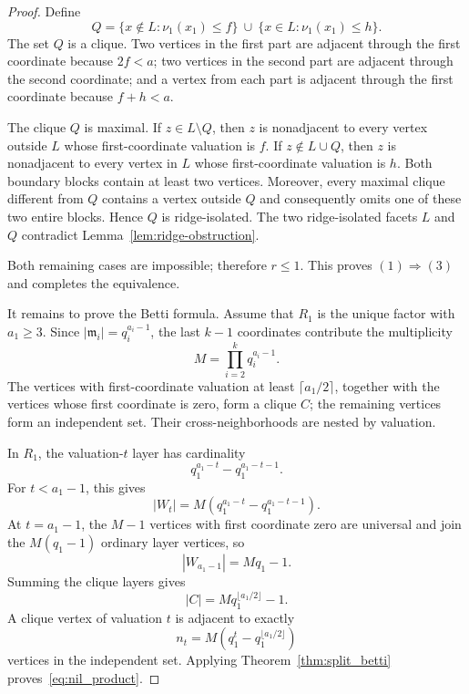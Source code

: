 \documentclass[10pt,a4paper]{amsart}
\begin{document}
\begin{proof}
Define
\[
Q=
\{x\notin L:\nu_1(x_1)\le f\}
\ \cup\
\{x\in L:\nu_1(x_1)\le h\}.
\]
The set $Q$ is a clique.  Two vertices in the first part are adjacent through the first coordinate because $2f<a$; two vertices in the second part are adjacent through the second coordinate; and a vertex from each part is adjacent through the first coordinate because $f+h<a$.

The clique $Q$ is maximal.  If $z\in L\setminus Q$, then $z$ is nonadjacent to every vertex outside $L$ whose first-coordinate valuation is $f$.  If $z\notin L\cup Q$, then $z$ is nonadjacent to every vertex in $L$ whose first-coordinate valuation is $h$.  Both boundary blocks contain at least two vertices.  Moreover, every maximal clique different from $Q$ contains a vertex outside $Q$ and consequently omits one of these two entire blocks.  Hence $Q$ is ridge-isolated.  The two ridge-isolated facets $L$ and $Q$ contradict Lemma~\ref{lem:ridge-obstruction}.

Both remaining cases are impossible; therefore $r\le1$.  This proves $(1)\Rightarrow(3)$ and completes the equivalence.

It remains to prove the Betti formula.  Assume that $R_1$ is the unique factor with $a_1\ge3$.  Since $|\mathfrak m_i|=q_i^{a_i-1}$, the last $k-1$ coordinates contribute the multiplicity
\[
M=\prod_{i=2}^{k}q_i^{a_i-1}.
\]
The vertices with first-coordinate valuation at least $\lceil a_1/2\rceil$, together with the vertices whose first coordinate is zero, form a clique $C$; the remaining vertices form an independent set.  Their cross-neighborhoods are nested by valuation.

In $R_1$, the valuation-$t$ layer has cardinality
\[
q_1^{a_1-t}-q_1^{a_1-t-1}.
\]
For $t<a_1-1$, this gives
\[
|W_t|=M(q_1^{a_1-t}-q_1^{a_1-t-1}).
\]
At $t=a_1-1$, the $M-1$ vertices with first coordinate zero are universal and join the $M(q_1-1)$ ordinary layer vertices, so
\[
|W_{a_1-1}|=Mq_1-1.
\]
Summing the clique layers gives
\[
|C|=Mq_1^{\lfloor a_1/2\rfloor}-1.
\]
A clique vertex of valuation $t$ is adjacent to exactly
\[
n_t=M(q_1^t-q_1^{\lfloor a_1/2\rfloor})
\]
vertices in the independent set.  Applying Theorem~\ref{thm:split_betti} proves~\eqref{eq:nil_product}.
\end{proof}
\end{document}
